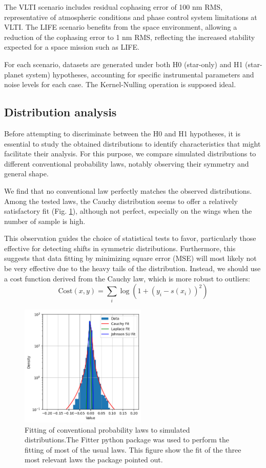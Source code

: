 \documentclass{article}
\begin{document}
The VLTI scenario includes residual cophasing error of 100 nm RMS, representative of atmospheric conditions and phase control system limitations at VLTI. The LIFE scenario benefits from the space environment, allowing a reduction of the cophasing error to 1 nm RMS, reflecting the increased stability expected for a space mission such as LIFE.

For each scenario, datasets are generated under both H0 (star-only) and H1 (star-planet system) hypotheses, accounting for specific instrumental parameters and noise levels for each case. The Kernel-Nulling operation is supposed ideal.

\subsection{Distribution analysis}  \label{sec:distribution_analysis}

Before attempting to discriminate between the H0 and H1 hypotheses, it is essential to study the obtained distributions to identify characteristics that might facilitate their analysis. For this purpose, we compare simulated distributions to different conventional probability laws, notably observing their symmetry and general shape.

We find that no conventional law perfectly matches the observed distributions. Among the tested laws, the Cauchy distribution seems to offer a relatively satisfactory fit (Fig. \ref{fig:fits}), although not perfect, especially on the wings when the number of sample is high.

This observation guides the choice of statistical tests to favor, particularly those effective for detecting shifts in symmetric distributions. Furthermore, this suggests that data fitting by minimizing square error (MSE) will most likely not be very effective due to the heavy tails of the distribution. Instead, we should use a cost function derived from the Cauchy law, which is more robust to outliers:
\begin{equation}
    \text{Cost}(x, y) = \sum_i \log \left( 1 + \left( y_i - s(x_i )\right)^2 \right)
\end{equation}

\begin{figure}[H]
\centering
\includegraphics[width=6cm]{img/fits.png}
\caption{Fitting of conventional probability laws to simulated distributions.The Fitter python package was used to perform the fitting of most of the usual laws. This figure show the fit of the three most relevant laws the package pointed out.}
\label{fig:fits}
\end{figure}
\end{document}
